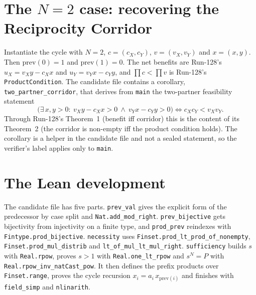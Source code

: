 \documentclass[11pt]{article}
\theoremstyle{definition}
\theoremstyle{remark}
\begin{document}
\section{The \texorpdfstring{$N=2$}{N = 2} case: recovering the Reciprocity Corridor}
\label{sec:n2}
Instantiate the cycle with $N=2$, $c=(c_X,c_Y)$, $v=(v_X,v_Y)$ and $x=(x,y)$. Then
$\mathrm{prev}(0)=1$ and $\mathrm{prev}(1)=0$. The net benefits are Run-128's $u_X=v_Xy-c_Xx$ and
$u_Y=v_Yx-c_Yy$, and $\prod c<\prod v$ is Run-128's \texttt{ProductCondition}. The candidate file
contains a corollary, \texttt{two\_partner\_corridor}, that derives from \texttt{main} the
two-partner feasibility statement
\[
\bigl(\exists\,x,y>0:\ v_Xy-c_Xx>0\ \wedge\ v_Yx-c_Yy>0\bigr)\iff c_Xc_Y<v_Xv_Y .
\]
Through Run-128's Theorem~1 (benefit iff corridor) this is the content of its Theorem~2 (the
corridor is non-empty iff the product condition holds). The corollary is a helper in the candidate
file and not a sealed statement, so the verifier's label applies only to \texttt{main}.

\section{The Lean development}
\label{sec:proof}
The candidate file has five parts. \texttt{prev\_val} gives the explicit form of the predecessor by
case split and \texttt{Nat.add\_mod\_right}. \texttt{prev\_bijective} gets bijectivity from
injectivity on a finite type, and \texttt{prod\_prev} reindexes with
\texttt{Fintype.prod\_bijective}. \texttt{necessity} uses
\texttt{Finset.prod\_lt\_prod\_of\_nonempty}, \texttt{Finset.prod\_mul\_distrib} and
\texttt{lt\_of\_mul\_lt\_mul\_right}. \texttt{sufficiency} builds $s$ with \texttt{Real.rpow},
proves $s>1$ with \texttt{Real.one\_lt\_rpow} and $s^N=P$ with
\texttt{Real.rpow\_inv\_natCast\_pow}. It then defines the prefix products over
\texttt{Finset.range}, proves the cycle recursion $x_i=a_i\,x_{\mathrm{prev}(i)}$ and finishes with
\texttt{field\_simp} and \texttt{nlinarith}.
\end{document}

